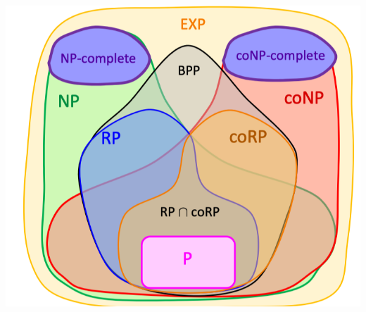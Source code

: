 \documentclass[10pt,landscape,a4paper]{article}
\begin{document}
\begin{multicols*}{3}
\includegraphics[scale=0.3]{time_complexity}


\end{multicols*}
\end{document}
